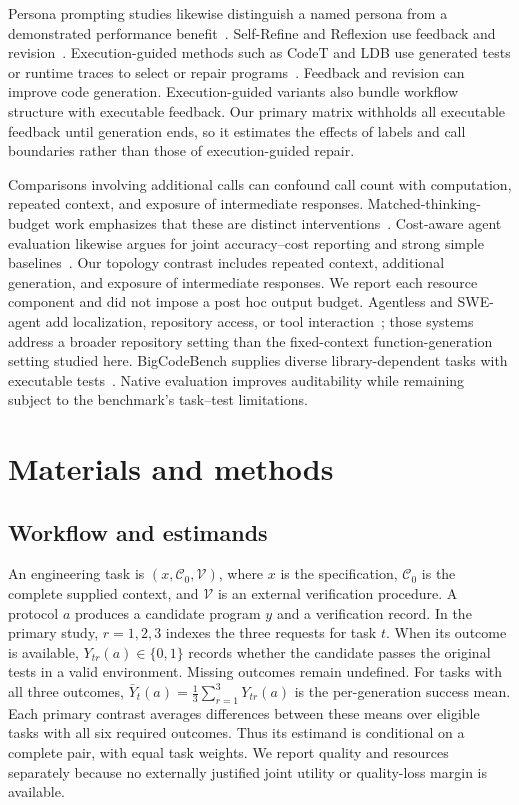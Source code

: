 \documentclass[10pt,letterpaper]{article}
\begin{document}
Persona prompting studies likewise distinguish a named persona from a demonstrated performance benefit~\cite{zheng2024personas,araujo2025personas}. Self-Refine and Reflexion use feedback and revision~\cite{madaan2023selfrefine,shinn2023reflexion}. Execution-guided methods such as CodeT and LDB use generated tests or runtime traces to select or repair programs~\cite{chen2023codet,zhong2024ldb}. Feedback and revision can improve code generation. Execution-guided variants also bundle workflow structure with executable feedback. Our primary matrix withholds all executable feedback until generation ends, so it estimates the effects of labels and call boundaries rather than those of execution-guided repair.

Comparisons involving additional calls can confound call count with computation, repeated context, and exposure of intermediate responses. Matched-thinking-budget work emphasizes that these are distinct interventions~\cite{tran2026budget}. Cost-aware agent evaluation likewise argues for joint accuracy--cost reporting and strong simple baselines~\cite{kapoor2025agents}. Our topology contrast includes repeated context, additional generation, and exposure of intermediate responses. We report each resource component and did not impose a post hoc output budget. Agentless and SWE-agent add localization, repository access, or tool interaction~\cite{xia2025agentless,yang2024sweagent}; those systems address a broader repository setting than the fixed-context function-generation setting studied here. BigCodeBench supplies diverse library-dependent tasks with executable tests~\cite{zhuo2024bigcodebench}. Native evaluation improves auditability while remaining subject to the benchmark's task--test limitations.

\section*{Materials and methods}
\subsection*{Workflow and estimands}
An engineering task is $(x,\mathcal{C}_0,\mathcal{V})$, where $x$ is the specification, $\mathcal{C}_0$ is the complete supplied context, and $\mathcal{V}$ is an external verification procedure. A protocol $a$ produces a candidate program $y$ and a verification record. In the primary study, $r=1,2,3$ indexes the three requests for task $t$. When its outcome is available, $Y_{tr}(a)\in\{0,1\}$ records whether the candidate passes the original tests in a valid environment. Missing outcomes remain undefined. For tasks with all three outcomes, $\bar Y_t(a)=\frac{1}{3}\sum_{r=1}^{3}Y_{tr}(a)$ is the per-generation success mean. Each primary contrast averages differences between these means over eligible tasks with all six required outcomes. Thus its estimand is conditional on a complete pair, with equal task weights. We report quality and resources separately because no externally justified joint utility or quality-loss margin is available.
\end{document}
